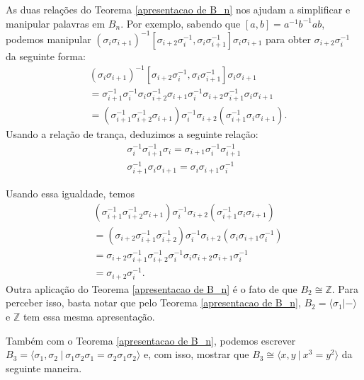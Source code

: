 	\par\vspace{0.3cm} As duas relações do Teorema \ref{apresentacao de B_n} nos ajudam a simplificar 
	e manipular palavras em $B_n$. Por exemplo, sabendo que $[a,b] = a^{-1}b^{-1}ab$, podemos manipular
	$(\sigma_i\sigma_{i+1})^{-1}[\sigma_{i+2}\sigma_i^{-1}, \sigma_i\sigma_{i+1}^{-1}]\sigma_i\sigma_{i+1}$ 
	para obter $\sigma_{i+2}\sigma_i^{-1}$ da seguinte forma:
	\begin{align*}
	    &(\sigma_i\sigma_{i+1})^{-1}[\sigma_{i+2}\sigma_i^{-1}, \sigma_i\sigma_{i+1}^{-1}]\sigma_i\sigma_{i+1} \\
	    &= \sigma_{i+1}^{-1}\sigma_i^{-1}\sigma_i\sigma_{i+2}^{-1}\sigma_{i+1}\sigma_i^{-1}\sigma_{i+2}
	    \sigma_{i+1}^{-1}\sigma_i\sigma_{i+1}  \\
	    &= (\sigma_{i+1}^{-1}\sigma_{i+2}^{-1}\sigma_{i+1})\sigma_i^{-1}\sigma_{i+2}(\sigma_{i+1}^{-1}
	    \sigma_i\sigma_{i+1}).
	\end{align*}
	Usando a relação de trança, deduzimos a seguinte relação:
	\begin{align*}
	    \sigma_i^{-1}\sigma_{i+1}^{-1}\sigma_i = \sigma_{i+1}\sigma_i^{-1}\sigma_{i+1}^{-1} \\
	    \sigma_{i+1}^{-1}\sigma_i\sigma_{i+1} = \sigma_i\sigma_{i+1}\sigma_i^{-1}   
	\end{align*}
	\par\vspace{0.3cm} Usando essa igualdade, temos
	\begin{align*}
	    &(\sigma_{i+1}^{-1}\sigma_{i+2}^{-1}\sigma_{i+1})\sigma_i^{-1}\sigma_{i+2}(\sigma_{i+1}^{-1}
	    \sigma_i\sigma_{i+1}) \\
	    &= (\sigma_{i+2}\sigma_{i+1}^{-1}\sigma_{i+2}^{-1})\sigma_i^{-1}\sigma_{i+2}(\sigma_i\sigma_{i+1}
	    \sigma_i^{-1}) \\
    	&= \sigma_{i+2}\sigma_{i+1}^{-1}\sigma_{i+2}^{-1}\sigma_i^{-1}\sigma_i\sigma_{i+2}\sigma_{i+1}
    	\sigma_i^{-1} \\
    	&= \sigma_{i+2}\sigma_i^{-1}.
	\end{align*}
	Outra aplicação do Teorema \ref{apresentacao de B_n} é o fato de que 
	$B_2\cong\mathbb{Z}$. Para perceber isso, basta notar que pelo Teorema \ref{apresentacao de B_n}, 
	$B_2 = \langle \sigma_1 | - \rangle$ e $\mathbb{Z}$ tem essa mesma apresentação. 
	
	\par\vspace{0.3cm} Também com o Teorema \ref{apresentacao de B_n}, podemos escrever 
	$B_3 = \langle \sigma_1,\sigma_2 \ | \ \sigma_1\sigma_2\sigma_1 = \sigma_2\sigma_1\sigma_2 \rangle$ e, 
	com isso, mostrar que $B_3 \cong\langle x,y \ | \ x^3=y^2 \rangle$ da seguinte maneira.
	
